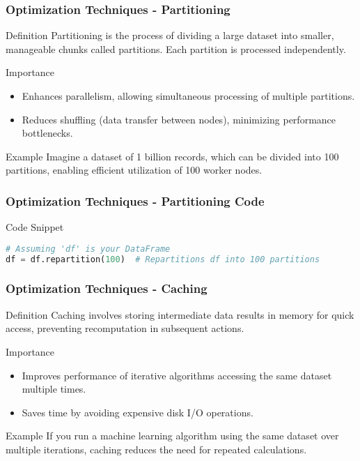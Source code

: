 \documentclass[aspectratio=169]{beamer}
\begin{document}
\begin{frame}[fragile]
    \frametitle{Optimization Techniques - Partitioning}
    \begin{block}{Definition}
        Partitioning is the process of dividing a large dataset into smaller, manageable chunks called partitions. Each partition is processed independently.
    \end{block}
    
    \begin{block}{Importance}
        \begin{itemize}
            \item Enhances parallelism, allowing simultaneous processing of multiple partitions.
            \item Reduces shuffling (data transfer between nodes), minimizing performance bottlenecks.
        \end{itemize}
    \end{block}

    \begin{block}{Example}
        Imagine a dataset of 1 billion records, which can be divided into 100 partitions, enabling efficient utilization of 100 worker nodes.
    \end{block}
\end{frame}

\begin{frame}[fragile]
    \frametitle{Optimization Techniques - Partitioning Code}
    \begin{block}{Code Snippet}
    \begin{lstlisting}[language=python]
# Assuming 'df' is your DataFrame
df = df.repartition(100)  # Repartitions df into 100 partitions
    \end{lstlisting}
    \end{block}
\end{frame}

\begin{frame}[fragile]
    \frametitle{Optimization Techniques - Caching}
    \begin{block}{Definition}
        Caching involves storing intermediate data results in memory for quick access, preventing recomputation in subsequent actions.
    \end{block}

    \begin{block}{Importance}
        \begin{itemize}
            \item Improves performance of iterative algorithms accessing the same dataset multiple times.
            \item Saves time by avoiding expensive disk I/O operations.
        \end{itemize}
    \end{block}

    \begin{block}{Example}
        If you run a machine learning algorithm using the same dataset over multiple iterations, caching reduces the need for repeated calculations.
    \end{block}
\end{frame}
\end{document}
